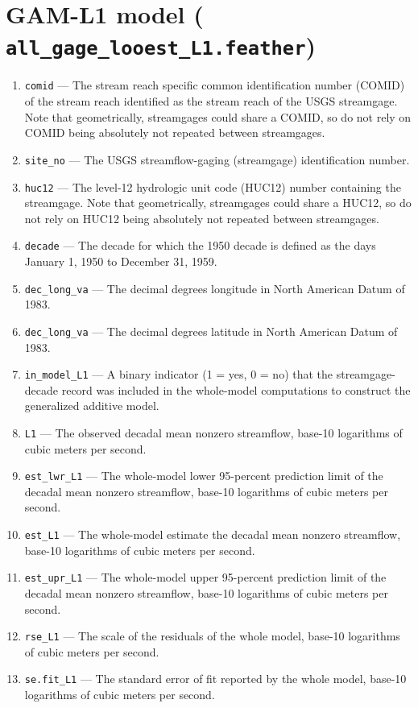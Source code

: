 \documentclass[1p, authoryear, 11pt, times, preprint]{elsarticle}
\newcommand{\code}[1]{{\color{black}%
                       \mbox{\lstinline[basicstyle={\small\ttfamily},
                                        keywordstyle=\scriptsize\ttfamily]|#1|}}}
\begin{document}
\section{GAM-L1 model (\code{all_gage_looest_L1.feather})}
\begin{enumerate}
\footnotesize
\RaggedRight
\item \code{comid} --- The stream reach specific common identification number (COMID) of the stream reach identified as the stream reach of the USGS streamgage. Note that geometrically, streamgages could share a COMID, so do not rely on COMID being absolutely not repeated between streamgages.
\item \code{site_no} --- The USGS streamflow-gaging (streamgage) identification number.
\item \code{huc12} --- The level-12 hydrologic unit code (HUC12) number containing the streamgage. Note that geometrically, streamgages could share a HUC12, so do not rely on HUC12 being absolutely not repeated between streamgages.
\item \code{decade} --- The decade for which the 1950 decade is defined as the days January 1, 1950 to December 31, 1959.
\item \code{dec_long_va} --- The decimal degrees longitude in North American Datum of 1983.
\item \code{dec_long_va} --- The decimal degrees latitude in North American Datum of 1983.
\item \code{in_model_L1} --- A binary indicator (1 = yes, 0 = no) that the streamgage-decade record was included in the whole-model computations to construct the generalized additive model.
\item \code{L1} --- The observed decadal mean nonzero streamflow, base-10 logarithms of cubic meters per second.
\item \code{est_lwr_L1} --- The whole-model lower 95-percent prediction limit of the decadal mean nonzero streamflow, base-10 logarithms of cubic meters per second.
\item \code{est_L1} --- The whole-model estimate the decadal mean nonzero streamflow, base-10 logarithms of cubic meters per second.
\item \code{est_upr_L1} --- The whole-model upper 95-percent prediction limit of the decadal mean nonzero streamflow, base-10 logarithms of cubic meters per second.
\item \code{rse_L1} --- The scale of the residuals of the whole model, base-10 logarithms of cubic meters per second.
\item \code{se.fit_L1} --- The standard error of fit reported by the whole model, base-10 logarithms of cubic meters per second.

\end{enumerate}
\end{document}
